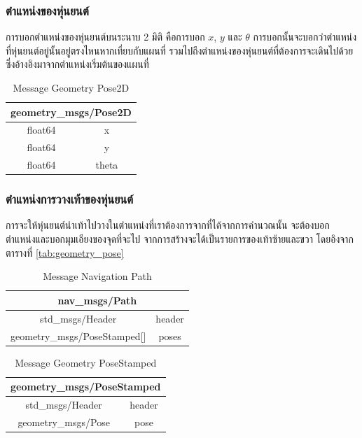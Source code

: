 \clearpage
\subsubsection*{ตำแหน่งของหุ่นยนต์}
การบอกตำแหน่งของหุ่นยนต์บนระนาบ 2 มิติ คือการบอก $x$, $y$ และ $\theta$
การบอกนั้นจะบอกว่าตำแหน่งที่หุ่นยนต์อยู่นั้นอยู่ตรงไหนหากเที่ยบกับแผนที่
รวมไปถึงตำแหน่งของหุ่นยนต์ที่ต้องการจะเดินไปด้วย ซึ่งอ้างอิงมาจากตำแหน่งเริ่มต้นของแผนที่ 
\begin{table}[!ht]
	\centering
	\begin{tabular}{| c | c |}
		\hline
		\multicolumn{2}{|c|}{geometry\_msgs/Pose2D}\\
		\hline
		float64 & x \\
		float64 & y \\
		float64 & theta \\
		\hline
	\end{tabular}
	\caption{Message Geometry Pose2D}
	\label{tab:geometry_pose2d}
\end{table}

\subsubsection*{ตำแหน่งการวางเท้าของหุ่นยนต์}
การจะให้หุ่นยนต์นำเท้าไปวางในตำแหน่งที่เราต้องการจากที่ได้จากการคำนวณนั้น
จะต้องบอกตำแหน่งและบอกมุมเอียงของจุดที่จะไป จากการสร้างจะได้เป็นรายการของเท้าซ้ายและขวา
โดยอิงจาก ตารางที่ \ref{tab:geometry_pose}
\begin{table}[!ht]
	\centering
	\begin{tabular}{| c | c |}
		\hline
		\multicolumn{2}{|c|}{nav\_msgs/Path}\\
		\hline
		std\_msgs/Header & header \\
		geometry\_msgs/PoseStamped[] & poses \\
		\hline
	\end{tabular}
	\caption{Message Navigation Path}
	\label{tab:nav_path}
\end{table}
\begin{table}[!ht]
	\centering
	\begin{tabular}{| c | c |}
		\hline
		\multicolumn{2}{|c|}{geometry\_msgs/PoseStamped}\\
		\hline
		std\_msgs/Header & header \\
		geometry\_msgs/Pose & pose \\
		\hline
	\end{tabular}
	\caption{Message Geometry PoseStamped}
	\label{tab:geometry_posestamped}
\end{table}

